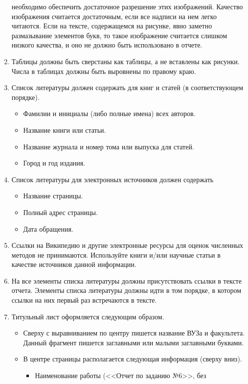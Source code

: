 \documentclass[a4paper,12pt,titlepage,draft]{article}
\begin{document}
\begin{enumerate}
	необходимо обеспечить достаточное разрешение этих изображений. Качество
	изображения считается достаточным, если все надписи на нем легко
	читаются. Если на тексте, содержащемся на рисунке, явно заметно
	размазывание элементов букв, то такое изображение считается слишком
	низкого качества, и оно не должно быть использовано в отчете.
    \item Таблицы должны быть сверстаны как таблицы, а не вставлены как рисунки.
	Числа в таблицах должны быть выровнены по правому краю.
    \item Список литературы должен содержать для книг и статей (в
	соответствующем порядке).
	\begin{itemize}
	    \item Фамилии и инициалы (либо полные имена) всех авторов.
	    \item Название книги или статьи.
	    \item Название журнала и номер тома или выпуска для статей.
	    \item Город и год издания.
	\end{itemize}
    \item Список литературы для электронных источников должен содержать
	\begin{itemize}
	    \item Название страницы.
	    \item Полный адрес страницы.
	    \item Дата обращения.
	\end{itemize}
    \item Ссылки на Википедию и другие электронные ресурсы для оценок численных
	методов не принимаются. Используйте книги и/или научные статьи в
	качестве источников данной информации.
    \item На все элементы списка литературы должны присутствовать ссылки в
	тексте отчета. Элементы списка литературы должны идти в том порядке, в
	котором ссылки на них первый раз встречаются в тексте.
    \item Титульный лист оформляется следующим образом.
	\begin{itemize}
	    \item Сверху с выравниванием по центру пишется название ВУЗа и
		факультета. Данный фрагмент пишется заглавными или малыми
		заглавными буквами.
	    \item В центре страницы располагается следующая информация (сверху вниз).
		\begin{itemize}
		    \item Наименование работы (<<Отчет по заданию №6>>, без

\end{itemize}
\end{itemize}
\end{enumerate}
\end{document}
